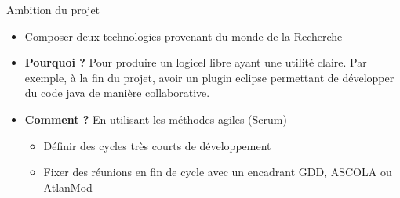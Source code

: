 \begin{frame}{Ambition du projet}
\begin{itemize}
  \item Composer deux technologies provenant du monde de la Recherche
  \item \textbf{Pourquoi ?} Pour produire un logicel libre ayant une utilité
  claire. Par exemple, à la fin du projet, avoir un plugin eclipse permettant de
  développer du code java de manière collaborative.
  \item \textbf{Comment ?} En utilisant les méthodes agiles (Scrum)
    \begin{itemize}
    \item Définir des cycles très courts de développement
    \item Fixer des réunions en fin de cycle avec un encadrant GDD, ASCOLA ou
    AtlanMod
    \end{itemize}
\end{itemize}
\end{frame}

